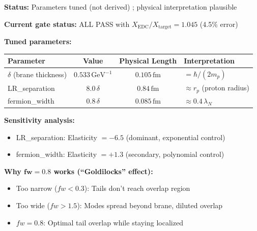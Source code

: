 
\begin{tcolorbox}[
    colback=yellow!5!white,
    colframe=orange!75!black,
    title={\textbf{BVP Tuning: Why These Parameters Work}},
    fonttitle=\bfseries
]

\textbf{Status:} Parameters tuned (not derived) \tagDc{}; physical interpretation plausible \tagDc{}

\vspace{0.5em}
\textbf{Current gate status:} ALL PASS with $X_{\text{EDC}}/X_{\text{target}} = 1.045$ (4.5\% error)

\vspace{0.5em}
\textbf{Tuned parameters:}
\begin{center}
\begin{tabular}{lccl}
\toprule
\textbf{Parameter} & \textbf{Value} & \textbf{Physical Length} & \textbf{Interpretation} \\
\midrule
$\delta$ (brane thickness) & $0.533\,\text{GeV}^{-1}$ & $0.105\,\text{fm}$ & $= \hbar/(2m_p)$ \\
LR\_separation & $8.0\,\delta$ & $0.84\,\text{fm}$ & $\approx r_p$ (proton radius) \\
fermion\_width & $0.8\,\delta$ & $0.085\,\text{fm}$ & $\approx 0.4\,\lambda_N$ \\
\bottomrule
\end{tabular}
\end{center}

\textbf{Sensitivity analysis:}
\begin{itemize}[leftmargin=*, itemsep=0pt]
    \item LR\_separation: Elasticity $= -6.5$ (dominant, exponential control)
    \item fermion\_width: Elasticity $= +1.3$ (secondary, polynomial control)
\end{itemize}

\textbf{Why $\mathbf{fw = 0.8}$ works (``Goldilocks'' effect):}
\begin{itemize}[leftmargin=*, itemsep=0pt]
    \item Too narrow ($fw < 0.3$): Tails don't reach overlap region
    \item Too wide ($fw > 1.5$): Modes spread beyond brane, diluted overlap
    \item $fw = 0.8$: Optimal tail overlap while staying localized
\end{itemize}


\end{tcolorbox}
